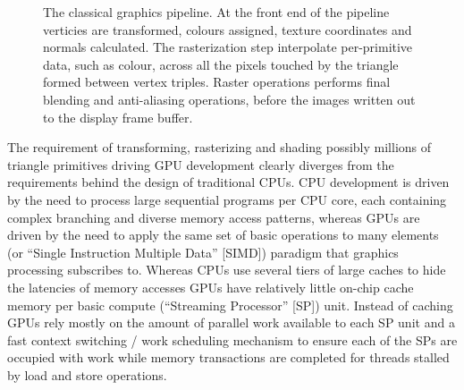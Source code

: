 \begin{figure}[ht!]
 \begin{mdframed}
 \centering
 \caption[Graphics pipeline]{The classical graphics pipeline. At the front end of the pipeline verticies are transformed, colours assigned,
 texture coordinates and normals calculated. The rasterization step interpolate per-primitive data, such as colour, across all the pixels 
 touched by the triangle formed between vertex triples. Raster operations performs final blending and anti-aliasing operations, before the images written
 out to the display frame buffer.}
 \label{fig_graphics_pipeline}
 \end{mdframed}
\end{figure}

The requirement of transforming, rasterizing and shading possibly millions of triangle primitives driving GPU development clearly diverges from the requirements behind the
design of traditional CPUs. CPU development is driven by the need to process large sequential programs per CPU core, each containing complex branching and diverse memory access patterns, 
whereas GPUs are driven by the need to apply the same set of basic operations to many elements (or ``Single Instruction Multiple Data'' [SIMD]) paradigm that graphics processing subscribes to. 
Whereas CPUs use several tiers of large caches to hide the latencies of memory accesses GPUs have relatively little on-chip cache memory per basic compute (``Streaming Processor'' [SP]) 
unit. Instead of caching GPUs rely mostly on the amount of parallel work available to each SP unit and a fast context switching / work scheduling mechanism to ensure each of the SPs are 
occupied with work while memory transactions are completed for threads stalled by load and store operations.

